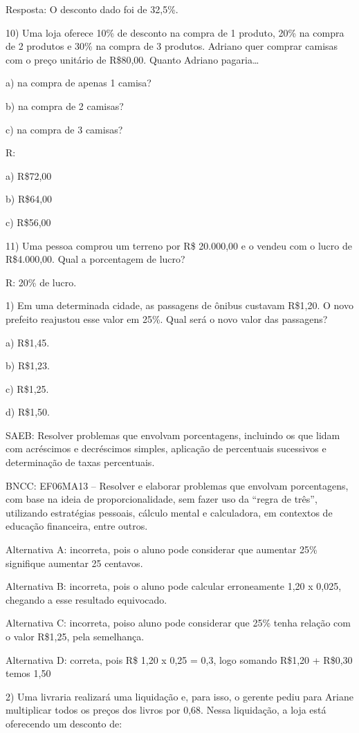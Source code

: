 Resposta: O desconto dado foi de 32,5\%.

10) Uma loja oferece 10\% de desconto na compra de 1 produto, 20\% na
compra de 2 produtos e 30\% na compra de 3 produtos. Adriano quer
comprar camisas com o preço unitário de R\$80,00. Quanto Adriano
pagaria\ldots{}

a) na compra de apenas 1 camisa?

b) na compra de 2 camisas?

c) na compra de 3 camisas?

R:

a) R\$72,00

b) R\$64,00

c) R\$56,00

11) Uma pessoa comprou um terreno por R\$ 20.000,00 e o vendeu com o
lucro de R\$4.000,00. Qual a porcentagem de lucro?

R: 20\% de lucro.


1) Em uma determinada cidade, as passagens de ônibus custavam R\$1,20. O
novo prefeito reajustou esse valor em 25\%. Qual será o novo valor das
passagens?

a) R\$1,45.

b) R\$1,23.

c) R\$1,25.

d) R\$1,50.

SAEB: Resolver problemas que envolvam porcentagens, incluindo os que
lidam com acréscimos e decréscimos simples, aplicação de percentuais
sucessivos e determinação de taxas percentuais.

BNCC: EF06MA13 -- Resolver e elaborar problemas que envolvam
porcentagens, com base na ideia de proporcionalidade, sem fazer uso da
``regra de três'', utilizando estratégias pessoais, cálculo mental e
calculadora, em contextos de educação financeira, entre outros.

Alternativa A: incorreta, pois o aluno pode considerar que aumentar 25\%
signifique aumentar 25 centavos.

Alternativa B: incorreta, pois o aluno pode calcular erroneamente 1,20 x
0,025, chegando a esse resultado equivocado.

Alternativa C: incorreta, poiso aluno pode considerar que 25\% tenha
relação com o valor R\$1,25, pela semelhança.

Alternativa D: correta, pois R\$ 1,20 x 0,25 = 0,3, logo somando R\$1,20
+ R\$0,30 temos 1,50

2) Uma livraria realizará uma liquidação e, para isso, o gerente pediu
para Ariane multiplicar todos os preços dos livros por 0,68. Nessa
liquidação, a loja está oferecendo um desconto de:


